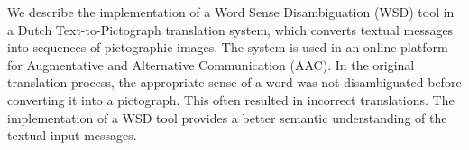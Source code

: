 We describe the implementation of a Word Sense Disambiguation (WSD) tool in a Dutch Text-to-Pictograph translation system, which converts textual messages into sequences of pictographic images. The system is used in an online platform for Augmentative and Alternative Communication (AAC). In the original translation process, the appropriate sense of a word was not disambiguated before converting it into a pictograph. This often resulted in incorrect translations. The implementation of a WSD tool provides a better semantic understanding of the textual input messages.

